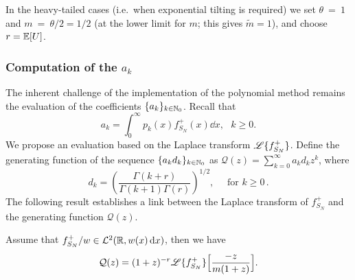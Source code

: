 In the heavy-tailed cases (i.e.\ when exponential tilting is required) we set $\theta~=~1$ and $m~=~\theta/2 = 1/2$ (at the lower limit for $m$; this gives $\widetilde{m}=1$), and choose $r = \operatorname{{\mathbb E}}[U]$.

\subsubsection{Computation of the $a_k$} \label{sssec:ComputingOrthogonalCoefficients}

The inherent challenge of the implementation of the polynomial method remains the evaluation of the coefficients $\{a_k \}_{k \in \mathbb{N}_0}$. Recall that
\begin{equation*}
a_{k}=\int_{0}^{\infty}p_k(x)f_{S_N}^+(x)\dd x,\text{ }k\geq0.
\end{equation*}
We propose an evaluation based on the Laplace transform $\mathscr{L}\{f_{S_N}^+\}$. Define the generating function of the sequence $\{a_k d_k \}_{k \in \mathbb{N}_0}$ as $\mathcal{Q}(z)=\sum_{k=0}^{\infty}a_{k}d_{k}z^{k}$, where
\begin{equation*}\label{eq:ck}
d_k= \left(\frac{\Gamma(k+r)}{\Gamma(k+1)\Gamma(r)}\right)^{1/2}, \quad \text{ for }k\geq0 \,.
\end{equation*}
The following result establishes a link between the Laplace transform of $f_{S_N}^+$  and the generating function $\mathcal{Q}(z)$.
\begin{proposition}\label{prop:LaplaceTransformPolynomialRepresentation}
Assume that $f_{S_N}^+/w\in\mathcal{L}^2(\mathbb{R}, w(x) \mathop{}\!\mathrm{d} x)$, then we have
\begin{equation}\label{eq:CoefficientGeneratingFunctionToLaplaceTransforn}
\mathcal{Q}(z)=(1+z)^{-r}\mathscr{L}\{f_{S_N}^+\}\Big[\frac{-z}{m(1+z)}\Big].
\end{equation}
\end{proposition}
